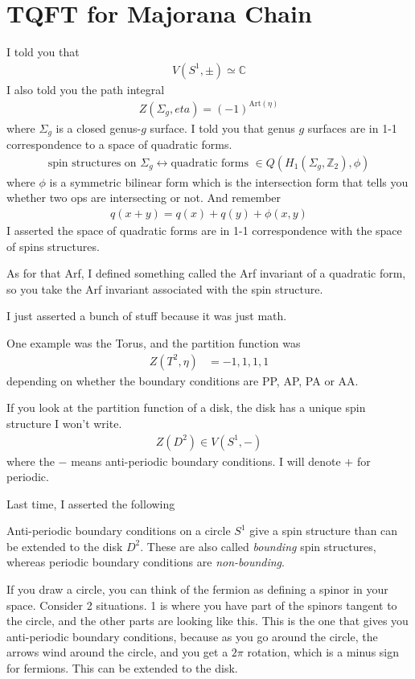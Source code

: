 \section{TQFT for Majorana Chain}
I told you that
\begin{align}
    V(S^1, \pm) \simeq \mathbb{C}
\end{align}
I also told you the path integral
\begin{align}
    Z(\Sigma_g,eta) = (-1)^{\textrm{Art}(\eta)}
\end{align}
where $\Sigma_g$ is a closed genus-$g$ surface.
I told you that genus $g$ surfaces are in 1-1 correspondence to a space of
quadratic forms.
\begin{align}
    \text{spin structures on }\Sigma_g \leftrightarrow
    \text{quadratic forms }\in Q\left( H_1\left( \Sigma_g, \mathbb{Z}_2 \right),
    \phi\right)
\end{align}
where $\phi$ is a symmetric bilinear form which is the intersection form that
tells you whether two ops are intersecting or not.
And remember
\begin{align}
    q(x + y) = q(x) + q(y) + \phi(x, y)
\end{align}
I asserted the space of quadratic forms are in 1-1 correspondence with the space
of spins structures.

As for that Arf,
I defined something called the Arf invariant of a quadratic form,
so you take the Arf invariant associated with the spin structure.

I just asserted a bunch of stuff because it was just math.

One example was the Torus, and the partition function was 
\begin{align}
    Z(T^2, \eta) &= -1, 1, 1, 1
\end{align}
depending on whether the boundary conditions are
PP, AP, PA or AA.

If you look at the partition function of a disk,
the disk has a unique spin structure I won't write.
\begin{align}
    Z\left( D^2 \right)
    \in
    V\left( S^1, - \right)
\end{align}
where the $-$ means anti-periodic boundary conditions.
I will denote $+$ for periodic.

Last time,
I asserted the following
\begin{proposition}
    Anti-periodic boundary conditions on a circle $S^1$ give a spin structure
    than can be extended to the disk $D^2$.
    These are also called \emph{bounding} spin structures,
    whereas periodic boundary conditions are \emph{non-bounding}.
\end{proposition}
If you draw a circle,
you can think of the fermion as defining a spinor in your space.
Consider 2 situations.
1 is where you have part of the spinors tangent to the circle,
and the other parts are looking like this.
This is the one that gives you anti-periodic boundary conditions,
because as you go around the circle,
the arrows wind around the circle,
and you get a $2\pi$ rotation,
which is a minus sign for fermions.
This can be extended to the disk.

